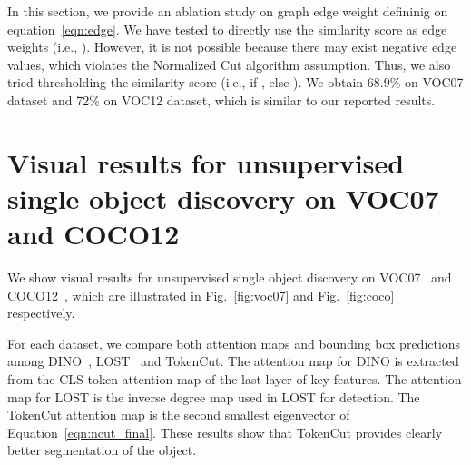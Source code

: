 \documentclass[twocolumn]{article}
\begin{document}
In this section, we provide an ablation study on graph edge weight defininig on equation~\ref{eqn:edge}. We have tested to directly use the similarity score as edge weights (i.e., ). However, it is not possible because there may exist negative edge values, which violates the Normalized Cut algorithm assumption. Thus, we also tried thresholding the similarity score (i.e.,  if , else ). We obtain 68.9\% on VOC07 dataset and 72\% on VOC12 dataset, which is similar to our reported results. 




\section{Visual results for unsupervised single object discovery on VOC07 and COCO12}
We show visual results for unsupervised single object discovery on VOC07~\cite{pascal-voc-2007} and COCO12~\cite{lin2014microsoft, vo2020toward}, which are illustrated in Fig.~\ref{fig:voc07} and Fig.~\ref{fig:coco} respectively.

For each dataset, we compare both attention maps and bounding box predictions among DINO~\cite{caron2021emerging}, LOST~\cite{simeoni2021localizing} and  TokenCut. The attention map for DINO is extracted from the CLS token attention map of the last layer of key features. The attention map for LOST is the inverse degree map used in LOST for detection. The TokenCut attention map is the second smallest eigenvector of Equation~\ref{eqn:ncut_final}. These results show that TokenCut provides clearly better segmentation of the object. 
\end{document}
